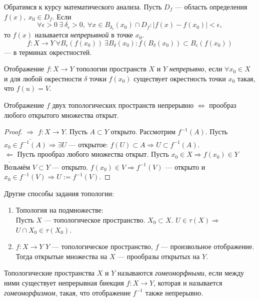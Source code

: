 \begin{definition} Обратимся к курсу математического анализа.
    Пусть $D_f$ — область определения $f(x),\ x_0\in D_f$. Если 
    \[\forall \epsilon>0\ \exists\ \delta_{\epsilon}>0,\ \forall x\in B_{\delta_{\epsilon}}(x_0)\cap D_f: |f(x)-f(x_0)|<\epsilon,\] 
    то $f(x)$ называется \textit{непрерывной} в точке $x_0$. \\
    $$f: X \to Y \ \forall B_{\epsilon}(f(x_0)) \ \exists B_{\delta}(x_0): f(B_{\delta}(x_0)) \subset B_{\epsilon}(f(x_0))$$ — в терминах окрестностей.
\end{definition}



\begin{definition}
    Отображение $f: X \to Y$ топологии пространств $X$ и $Y$ \textit{непрерывно}, если $\forall x_0 \in X$ и для любой окрестности $\delta$ точки $f(x_0)$ существует окрестность точки $x_0$ такая, что $f(u) = V$.
\end{definition}

\begin{statement}
    Отображение $f$ двух топологических пространств непрерывно $\Leftrightarrow$ прообраз любого открытого множества открыт.
\end{statement}
\begin{proof}
    $\underline{\Longrightarrow}$ $f: X \to Y$. Пусть $A \subset Y$ открыто. Рассмотрим $f^{-1}(A)$. Пусть $x_0 \in f^{-1}(A) \Rightarrow \exists U$ — открытое: $f(U) \subset A \Rightarrow U \subset f^{-1}(A)$. \\
    $\underline{\Longleftarrow}$ Пусть прообраз любого множества открыт. Пусть $x_0 \in X \Rightarrow f(x_0) \in Y$ Возьмём $V \subset Y$ — открыто. $f(x_0) \in V \Rightarrow f^{-1}(V)$ — открыто и $x_0 \in f^{-1}(V) \Rightarrow U := f^{-1}(V)$.
\end{proof}

Другие способы задания топологии:
\begin{enumerate}
    \item Топология на подмножестве: \\
    Пусть $X$ — топологическое пространство. $X_0 \subset X$. $U \in \tau(X) \Rightarrow$ $U \cap X_0 \in \tau(X_0)$.
    \item $f: X \to Y$ $Y$ — топологическое пространство, $f$ — произвольное отображение. Тогда открытые множества на $X$ — прообразы открытых на $Y$.
\end{enumerate}

\begin{definition}
    Топологические пространства $X$ и $Y$ называются \textit{гомеоморфными}, если между ними существует непрерывная биекция $f: X \to Y$, которая и называется \textit{гомеоморфизмом}, такая, что отображение $f^{-1}$ также непрерывно.
\end{definition}

